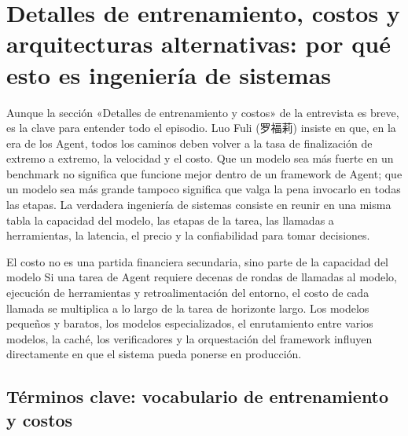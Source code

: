\section{Detalles de entrenamiento, costos y arquitecturas alternativas: por qué esto es ingeniería de sistemas}

Aunque la sección «Detalles de entrenamiento y costos» de la entrevista es breve, es la clave para entender todo el episodio. Luo Fuli (罗福莉) insiste en que, en la era de los Agent, todos los caminos deben volver a la tasa de finalización de extremo a extremo, la velocidad y el costo. Que un modelo sea más fuerte en un benchmark no significa que funcione mejor dentro de un framework de Agent; que un modelo sea más grande tampoco significa que valga la pena invocarlo en todas las etapas. La verdadera ingeniería de sistemas consiste en reunir en una misma tabla la capacidad del modelo, las etapas de la tarea, las llamadas a herramientas, la latencia, el precio y la confiabilidad para tomar decisiones.

\begin{importantbox}{El costo no es una partida financiera secundaria, sino parte de la capacidad del modelo}
Si una tarea de Agent requiere decenas de rondas de llamadas al modelo, ejecución de herramientas y retroalimentación del entorno, el costo de cada llamada se multiplica a lo largo de la tarea de horizonte largo. Los modelos pequeños y baratos, los modelos especializados, el enrutamiento entre varios modelos, la caché, los verificadores y la orquestación del framework influyen directamente en que el sistema pueda ponerse en producción.
\end{importantbox}

\subsection{Términos clave: vocabulario de entrenamiento y costos}

